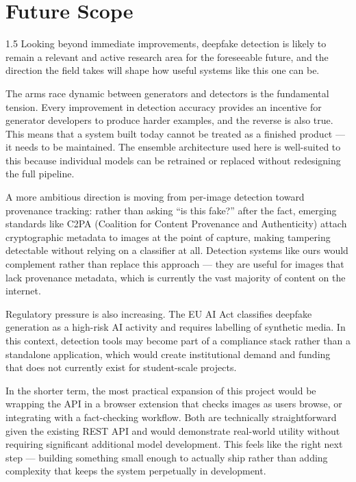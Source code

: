 \section{Future Scope}

\begin{spacing}{1.5}
Looking beyond immediate improvements, deepfake detection is likely to remain a relevant and active research area for the foreseeable future, and the direction the field takes will shape how useful systems like this one can be.

The arms race dynamic between generators and detectors is the fundamental tension. Every improvement in detection accuracy provides an incentive for generator developers to produce harder examples, and the reverse is also true. This means that a system built today cannot be treated as a finished product --- it needs to be maintained. The ensemble architecture used here is well-suited to this because individual models can be retrained or replaced without redesigning the full pipeline.

A more ambitious direction is moving from per-image detection toward provenance tracking: rather than asking ``is this fake?'' after the fact, emerging standards like C2PA (Coalition for Content Provenance and Authenticity) attach cryptographic metadata to images at the point of capture, making tampering detectable without relying on a classifier at all. Detection systems like ours would complement rather than replace this approach --- they are useful for images that lack provenance metadata, which is currently the vast majority of content on the internet.

Regulatory pressure is also increasing. The EU AI Act classifies deepfake generation as a high-risk AI activity and requires labelling of synthetic media. In this context, detection tools may become part of a compliance stack rather than a standalone application, which would create institutional demand and funding that does not currently exist for student-scale projects.

In the shorter term, the most practical expansion of this project would be wrapping the API in a browser extension that checks images as users browse, or integrating with a fact-checking workflow. Both are technically straightforward given the existing REST API and would demonstrate real-world utility without requiring significant additional model development. This feels like the right next step --- building something small enough to actually ship rather than adding complexity that keeps the system perpetually in development.
\end{spacing}
